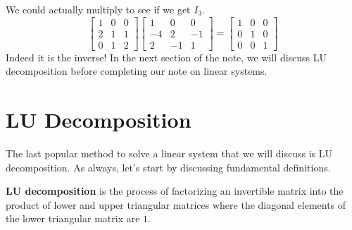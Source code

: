 \documentclass[../main.tex]{subfiles}
\begin{document}
We could actually multiply to see if we get $I_3$.
\[
\begin{bmatrix}
    1 & 0 & 0 \\
    2 & 1 & 1 \\
    0 & 1 & 2
\end{bmatrix}
\begin{bmatrix}
    1  & 0  & 0 \\
    -4 & 2  & -1 \\
    2  & -1 & 1
\end{bmatrix}
=
\begin{bmatrix}
    1 & 0 & 0 \\
    0 & 1 & 0 \\
    0 & 0 & 1
\end{bmatrix}
\]
Indeed it is the inverse! In the next section of the note,
we will discuss LU decomposition before completing our note on
linear systems.

\section{LU Decomposition}

The last popular method to solve a linear system that we will
discuss is LU decomposition. As always, let's start by discussing
fundamental definitions.

\begin{definition}
\textbf{LU decomposition} is the process of factorizing an
invertible matrix into the product of lower and upper triangular
matrices where the diagonal elements of the lower triangular matrix
are $1$.
\end{definition}
\end{document}
